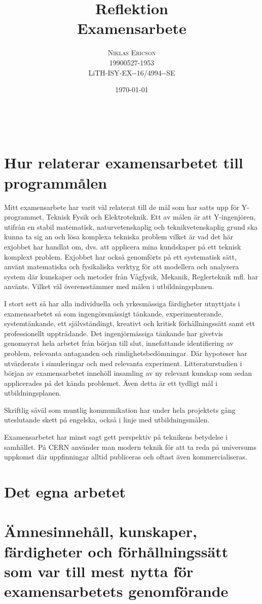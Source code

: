 \documentclass[a4paper, 11pt, margin=3cm]{article} %
\title{\textbf{Reflektion}\\ \vspace{5pt} %
Examensarbete} %
\author{\textsc{Niklas Ericson}
\\ 19900527-1953 %
\\ LiTH-ISY-EX-{-}16/4994-{-}SE}
\date{\today} %
\makeatletter
\renewcommand{\maketitle}{ %
{
\raggedright
{\LARGE\@title} %
}
\vspace{-45pt} %
\begin{flushright} %
{\large\@author} %
\\\@date %

\vspace{40pt} %
\end{flushright}
}
\makeatother
\begin{document}
\maketitle %

\section*{Hur relaterar examensarbetet till programmålen}
Mitt examensarbete har varit väl relaterat till de mål som har satts upp för Y-programmet, Teknisk Fysik och Elektroteknik. Ett av målen är att Y-ingenjören, utifrån en stabil matematisk, naturvetenskaplig och teknikvetenskaplig grund ska kunna ta sig an och lösa komplexa tekniska problem vilket är vad det här exjobbet har handlat om, dvs. att applicera mina kundskaper på ett teknisk komplext problem. Exjobbet har också genomförts på ett systematisk sätt, använt matematiska och fysikaliska verktyg för att modellera och analysera system där kunskaper och metoder från Vågfysik, Mekanik, Reglerteknik mfl. har använts. Vilket väl överensstämmer med målen i utbildningsplanen.

I stort sett så har alla individuella och yrkesmässiga färdigheter utnyttjats i examensarbetet så som ingengörsmässigt tänkande, experimenterande, systemtänkande, ett självständingt, kreativt och kritisk förhållningssätt samt ett professionellt uppträdande. Det ingenjörmässiga tänkande har givetvis genomsyrat hela arbetet från början till slut, innefattande  identifiering av problem, relevanta antaganden och rimlighetsbedömningar. Där hypoteser har utvärderats i simuleringar och med relevanta experiment. Litteraturstudien i början av examensarbetet innehöll insamling av ny relevant kunskap som sedan applicerades på det kända problemet. Även detta är ett tydligt mål i utbildningsplanen.

Skriftlig såväl som muntlig kommunikation har under hela projektets gång uteslutande skett på engelska, också i linje med utbildningsmålen.

Examensarbetet har minst sagt gett perspektiv på teknikens betydelse i samhället. På CERN använder man modern teknik för att ta reda på universums uppkomst där uppfinningar alltid publiceras och oftast även kommercialiseras.

\section*{Det egna arbetet}

\section*{Ämnesinnehåll, kunskaper, färdigheter och förhållningssätt som var till mest nytta för examensarbetets genomförande}
\end{document}
